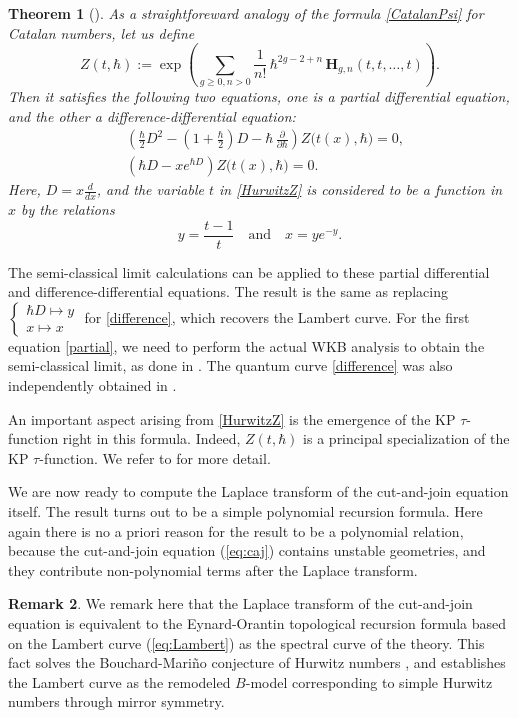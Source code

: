 \documentclass{amsart}
\newtheorem{thm}{Theorem}[section]
\theoremstyle{definition}
\newtheorem{rem}[thm]{Remark}
\numberwithin{equation}{section}
\numberwithin{figure}{section}
\newcommand{\be}{\begin{equation}}
\newcommand{\ee}{\end{equation}}
\begin{document}
\begin{thm}[\cite{BHLM,MSS, MS2015}]
As a straightforeward analogy of the formula \eqref{CatalanPsi} for 
Catalan numbers, let us define
\be
\label{HurwitzZ}
Z(t,\hbar):=
\exp\left(\sum_{g\ge0, n>0} \frac{1}{n!}\, 
\hbar ^{2g-2+n}\, \mathbf{H}_{g,n}(t,t,\dots,t)\right).
\ee
Then it satisfies the following  two equations, one is a partial 
differential equation, and
the other a difference-differential equation:
\begin{align}
\label{partial}
&\left(\frac{\hbar}{2} D^2 -\left(1+\frac{\hbar}{2}\right)D
-\hbar \,\frac{\partial}{\partial \hbar}\right)   Z\big(t(x),\hbar\big)= 0,
\\
\label{difference}
&
\left(
\hbar D - x e^{\hbar  D}
\right) Z\big(t(x),\hbar\big) = 0.
\end{align}
Here, $D = x\frac{d}{d x}$, and the variable 
$t$ in \eqref{HurwitzZ} is considered to be a function in $x$
by the relations
$$
y = \frac{t-1}{t} \quad \text{and}\quad x = y e^{-y}.
$$
\end{thm}

The semi-classical limit calculations can be applied to these partial differential
and difference-differential equations. The result is the same as
replacing 
$
\begin{cases}
\hbar D\longmapsto y\\
x\longmapsto x
\end{cases}
$
for \eqref{difference}, which recovers the Lambert curve. For the
first equation \eqref{partial}, we need to perform the actual
WKB analysis to obtain the semi-classical limit, as done in \cite{MS2015}.
The quantum curve
\eqref{difference} was also  independently obtained in \cite{Zhou4}.


An important aspect arising from \eqref{HurwitzZ} is the emergence of the
KP $\tau$-function right in this formula. Indeed, $Z(t,\hbar)$ is 
a principal specialization of the KP $\tau$-function. 
We refer to \cite{MS2015} for more detail.






We are now ready to 
compute the Laplace transform 
of the cut-and-join equation itself. The result turns out
to be a simple polynomial recursion formula. 
Here again there is no a priori reason for the result to be
a polynomial relation, because the cut-and-join
equation (\ref{eq:caj}) 
contains unstable geometries, and
they contribute non-polynomial terms after 
the Laplace transform.


\begin{rem}
We  remark here that the Laplace transform of
the cut-and-join equation is equivalent to 
the Eynard-Orantin topological recursion formula
\cite{EO1}
based on the Lambert curve 
(\ref{eq:Lambert}) as the spectral curve 
of the theory. 
This fact solves the Bouchard-Mari\~no 
conjecture \cite{BM} 
of Hurwitz numbers \cite{EMS, MZ}, and establishes
the Lambert curve as the remodeled $B$-model
corresponding to simple Hurwitz numbers
through mirror symmetry.
\end{rem}
\end{document}
